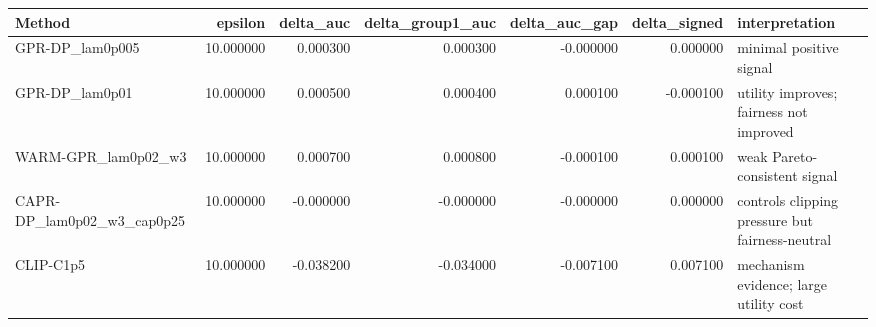 \begin{tabular}{lrrrrrl}
\toprule
Method & epsilon & delta_auc & delta_group1_auc & delta_auc_gap & delta_signed & interpretation \\
\midrule
GPR-DP_lam0p005 & 10.000000 & 0.000300 & 0.000300 & -0.000000 & 0.000000 & minimal positive signal \\
GPR-DP_lam0p01 & 10.000000 & 0.000500 & 0.000400 & 0.000100 & -0.000100 & utility improves; fairness not improved \\
WARM-GPR_lam0p02_w3 & 10.000000 & 0.000700 & 0.000800 & -0.000100 & 0.000100 & weak Pareto-consistent signal \\
CAPR-DP_lam0p02_w3_cap0p25 & 10.000000 & -0.000000 & -0.000000 & -0.000000 & 0.000000 & controls clipping pressure but fairness-neutral \\
CLIP-C1p5 & 10.000000 & -0.038200 & -0.034000 & -0.007100 & 0.007100 & mechanism evidence; large utility cost \\
\bottomrule
\end{tabular}
